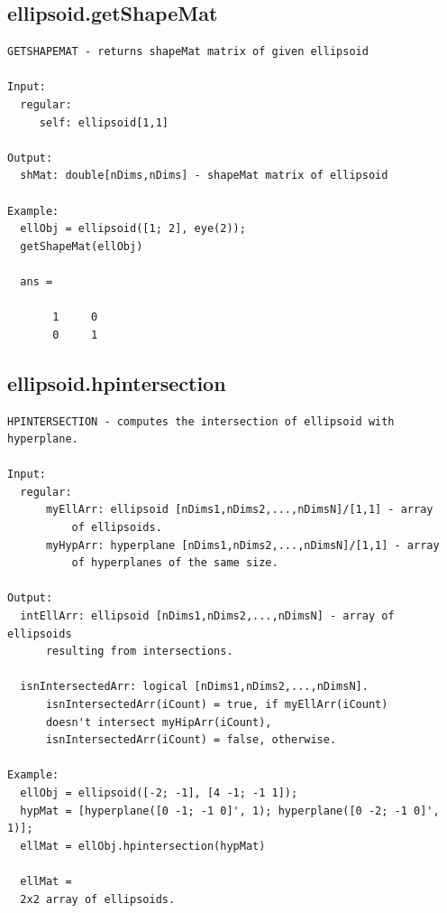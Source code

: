 \documentclass[letterpaper,10pt,english]{sphinxmanual}
\begin{document}
\subsection{ellipsoid.getShapeMat}
\label{chap_functions:ellipsoid-getshapemat}
\begin{Verbatim}[commandchars=\\\{\}]
GETSHAPEMAT - returns shapeMat matrix of given ellipsoid

Input:
  regular:
     self: ellipsoid[1,1]

Output:
  shMat: double[nDims,nDims] - shapeMat matrix of ellipsoid

Example:
  ellObj = ellipsoid([1; 2], eye(2));
  getShapeMat(ellObj)

  ans =

       1     0
       0     1
\end{Verbatim}


\subsection{ellipsoid.hpintersection}
\label{chap_functions:ellipsoid-hpintersection}
\begin{Verbatim}[commandchars=\\\{\}]
HPINTERSECTION - computes the intersection of ellipsoid with hyperplane.

Input:
  regular:
      myEllArr: ellipsoid [nDims1,nDims2,...,nDimsN]/[1,1] - array
          of ellipsoids.
      myHypArr: hyperplane [nDims1,nDims2,...,nDimsN]/[1,1] - array
          of hyperplanes of the same size.

Output:
  intEllArr: ellipsoid [nDims1,nDims2,...,nDimsN] - array of ellipsoids
      resulting from intersections.

  isnIntersectedArr: logical [nDims1,nDims2,...,nDimsN].
      isnIntersectedArr(iCount) = true, if myEllArr(iCount)
      doesn't intersect myHipArr(iCount),
      isnIntersectedArr(iCount) = false, otherwise.

Example:
  ellObj = ellipsoid([-2; -1], [4 -1; -1 1]);
  hypMat = [hyperplane([0 -1; -1 0]', 1); hyperplane([0 -2; -1 0]', 1)];
  ellMat = ellObj.hpintersection(hypMat)

  ellMat =
  2x2 array of ellipsoids.
\end{Verbatim}
\end{document}
